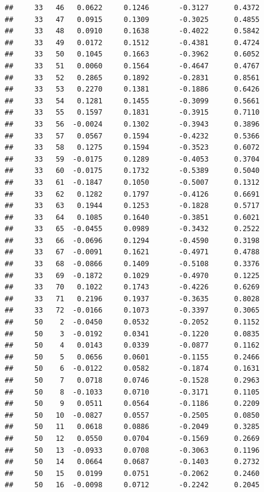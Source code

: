 \documentclass[
]{article}
\begin{document}
\begin{verbatim}
##     33   46   0.0622     0.1246       -0.3127      0.4372  
##     33   47   0.0915     0.1309       -0.3025      0.4855  
##     33   48   0.0910     0.1638       -0.4022      0.5842  
##     33   49   0.0172     0.1512       -0.4381      0.4724  
##     33   50   0.1045     0.1663       -0.3962      0.6052  
##     33   51   0.0060     0.1564       -0.4647      0.4767  
##     33   52   0.2865     0.1892       -0.2831      0.8561  
##     33   53   0.2270     0.1381       -0.1886      0.6426  
##     33   54   0.1281     0.1455       -0.3099      0.5661  
##     33   55   0.1597     0.1831       -0.3915      0.7110  
##     33   56  -0.0024     0.1302       -0.3943      0.3896  
##     33   57   0.0567     0.1594       -0.4232      0.5366  
##     33   58   0.1275     0.1594       -0.3523      0.6072  
##     33   59  -0.0175     0.1289       -0.4053      0.3704  
##     33   60  -0.0175     0.1732       -0.5389      0.5040  
##     33   61  -0.1847     0.1050       -0.5007      0.1312  
##     33   62   0.1282     0.1797       -0.4126      0.6691  
##     33   63   0.1944     0.1253       -0.1828      0.5717  
##     33   64   0.1085     0.1640       -0.3851      0.6021  
##     33   65  -0.0455     0.0989       -0.3432      0.2522  
##     33   66  -0.0696     0.1294       -0.4590      0.3198  
##     33   67  -0.0091     0.1621       -0.4971      0.4788  
##     33   68  -0.0866     0.1409       -0.5108      0.3376  
##     33   69  -0.1872     0.1029       -0.4970      0.1225  
##     33   70   0.1022     0.1743       -0.4226      0.6269  
##     33   71   0.2196     0.1937       -0.3635      0.8028  
##     33   72  -0.0166     0.1073       -0.3397      0.3065  
##     50    2  -0.0450     0.0532       -0.2052      0.1152  
##     50    3  -0.0192     0.0341       -0.1220      0.0835  
##     50    4   0.0143     0.0339       -0.0877      0.1162  
##     50    5   0.0656     0.0601       -0.1155      0.2466  
##     50    6  -0.0122     0.0582       -0.1874      0.1631  
##     50    7   0.0718     0.0746       -0.1528      0.2963  
##     50    8  -0.1033     0.0710       -0.3171      0.1105  
##     50    9   0.0511     0.0564       -0.1186      0.2209  
##     50   10  -0.0827     0.0557       -0.2505      0.0850  
##     50   11   0.0618     0.0886       -0.2049      0.3285  
##     50   12   0.0550     0.0704       -0.1569      0.2669  
##     50   13  -0.0933     0.0708       -0.3063      0.1196  
##     50   14   0.0664     0.0687       -0.1403      0.2732  
##     50   15   0.0199     0.0751       -0.2062      0.2460  
##     50   16  -0.0098     0.0712       -0.2242      0.2045  

\end{verbatim}
\end{document}
